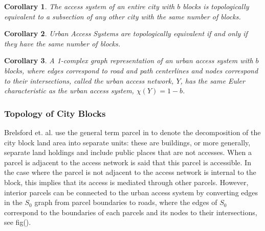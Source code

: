 \documentclass[10pt]{article}
\newtheorem{corollary}{Corollary}[theorem]
\begin{document}
\begin{corollary}
    The access system of an entire city with $b$ blocks is topologically equivalent to a subsection of any other city with the same number of blocks.
\end{corollary}

\begin{corollary}
    Urban Access Systems are topologically equivalent if and only if they have the same number of blocks. 
\end{corollary}

\begin{corollary}
    A 1-complex graph representation of an urban access system with $b$ blocks, where edges correspond to road and path centerlines and nodes correspond to their intersections, called the urban access network, $Y$, has the same Euler characteristic as the urban access system, $\chi(Y)=1-b$. 
\end{corollary}


\subsubsection{Topology of City Blocks}

Brelsford et. al. use the general term parcel in \cite{bre} to denote the decomposition of the city block land area into separate units: these are buildings, or more generally, separate land holdings and include public places that are not accesses. When a parcel is adjacent to the access network is said that this parcel is accessible. In the case where the parcel is not adjacent to the access network is internal to the block, this implies that its access is mediated through other parcels. However, interior parcels can be connected to the urban access system by converting edges in the $S_0$ graph from parcel boundaries to roads, where the edges of $S_0$ correspond to the boundaries of each parcels and its nodes to their intersections, see fig().\\
\end{document}
